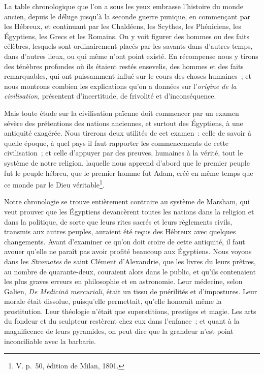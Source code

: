 \documentclass[french,twoside]{book} %
\newcommand\chaptercont{} %
\begin{document}
\chaptercont
\noindent  La table chronologique que l’on a sous les yeux embrasse l’histoire du monde ancien, depuis le déluge jusqu’à la seconde guerre punique, en commençant par les Hébreux, et continuant par les Chaldéens, les Scythes, les Phéniciens, les Égyptiens, les Grecs et les Romains. On y voit figurer des hommes ou des faits célèbres, lesquels sont ordinairement placés par les savants dans d’autres temps, dans d’autres lieux, ou qui même n’ont point existé. En récompense nous y tirons des ténèbres profondes où ils étaient restés ensevelis, des hommes et des faits remarquables, qui ont puissamment influé sur le cours des choses humaines ; et nous montrons combien les explications  qu’on a données sur l’{\itshape origine de la civilisation}, présentent d’incertitude, de frivolité et d’inconséquence.\par
\par
Mais toute étude sur la civilisation païenne doit commencer par un examen sévère des prétentions des nations anciennes, et surtout des Égyptiens, à une antiquité exagérée. Nous tirerons deux utilités de cet examen : celle de savoir à quelle époque, à quel pays il faut rapporter les commencements de cette civilisation ; et celle d’appuyer par des preuves, humaines à la vérité, tout le système de notre religion, laquelle nous apprend d’abord que le premier peuple fut le peuple hébreu, que le premier homme fut Adam, créé en même temps que ce monde par le Dieu véritable\footnote{V. p. 50, édition de Milan, 1801.}.\par
Notre chronologie se trouve entièrement contraire au système de Marsham, qui veut prouver que les Égyptiens devancèrent toutes les nations dans la religion et dans la politique, de sorte que leurs rites sacrés et leurs règlements civils, transmis aux autres peuples, auraient été reçus des Hébreux avec quelques changements. Avant d’examiner ce qu’on doit croire de cette antiquité, il faut avouer qu’elle ne paraît pas avoir profité beaucoup aux Égyptiens. Nous voyons dans les {\itshape Stromates} de saint Clément d’Alexandrie, que les livres du leurs prêtres,  au nombre de quarante-deux, couraient alors dans le public, et qu’ils contenaient les plus graves erreurs en philosophie et en astronomie. Leur médecine, selon Galien, {\itshape De Medicinâ mercuriali}, était un tissu de puérilités et d’impostures. Leur morale était dissolue, puisqu’elle permettait, qu’elle honorait même la prostitution. Leur théologie n’était que superstitions, prestiges et magie. Les arts du fondeur et du sculpteur restèrent chez eux dans l’enfance ; et quant à la magnificence de leurs pyramides, on peut dire que la grandeur n’est point inconciliable avec la barbarie.\par
\end{document}
